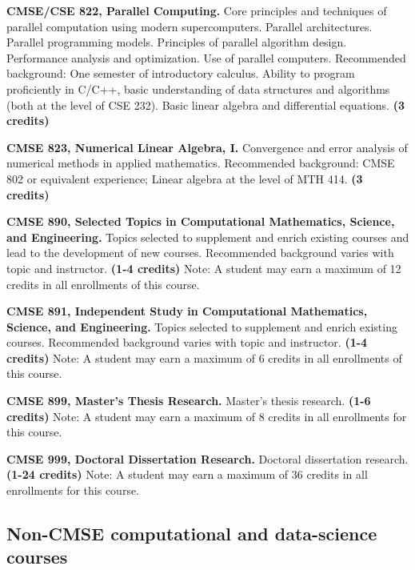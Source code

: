 \vspace{3mm}
\noindent
\textbf{CMSE/CSE 822, Parallel Computing.}  Core principles and
techniques of parallel computation using modern
supercomputers. Parallel architectures. Parallel programming
models. Principles of parallel algorithm design. Performance analysis
and optimization. Use of parallel computers.  Recommended background:
One semester of introductory calculus. Ability to program proficiently
in C/C++, basic understanding of data structures and algorithms (both
at the level of CSE 232). Basic linear algebra and differential
equations.  \textbf{(3 credits)}

\vspace{3mm}
\noindent
\textbf{CMSE 823, Numerical Linear Algebra, I.}  Convergence and error
analysis of numerical methods in applied mathematics.  Recommended
background: CMSE 802 or equivalent experience; Linear algebra at the
level of MTH 414. \textbf{(3 credits)}

\vspace{3mm}
\noindent
\textbf{CMSE 890, Selected Topics in Computational Mathematics,
  Science, and Engineering.}  Topics selected to supplement and enrich
existing courses and lead to the development of new courses.
Recommended background varies with topic and instructor.  \textbf{(1-4
  credits)}  Note: A student may earn a maximum of 12 credits in all
enrollments of this course.

\vspace{3mm}
\noindent
\textbf{CMSE 891, Independent Study in Computational Mathematics,
Science, and Engineering.}  Topics selected to supplement and enrich
existing courses.  Recommended background varies with topic and
instructor.  \textbf{(1-4 credits)} Note: A student may earn a maximum
of 6 credits in all enrollments of this course.

\vspace{3mm}
\noindent\textbf{CMSE 899, Master's Thesis Research.}  Master's thesis
research.  \textbf{(1-6 credits)}  Note: A student may earn a maximum
of 8 credits in all enrollments for this course.

\vspace{3mm}
\noindent\textbf{CMSE 999, Doctoral Dissertation Research.}  Doctoral
dissertation research.  \textbf{(1-24 credits)}   Note: A student may
earn a maximum of 36 credits in all enrollments for this course.

\vspace{3mm}

\subsection{Non-CMSE computational and data-science courses}

